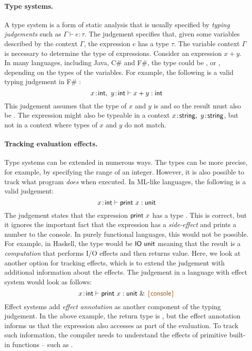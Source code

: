 \paragraph{Type systems.}
A type system is a form of static analysis that is usually specified by \emph{typing judgements}
such as $\Gamma \vdash e : \tau$. The judgement specifies that, given some variables described by
the context $\Gamma$, the expression $e$ has a type $\tau$.
The variable context $\Gamma$ is necessary to determine the type of expressions. Consider an
expression $x + y$. In many languages, including Java, C\# and F\#, the type could be ,
 or , depending on the types of the variables. For example,
the following is a valid typing judgement in F\# \cite{app-fsharp}:
%
\begin{equation*}
x\!:\!\ident{int},~y\!:\!\ident{int} \vdash x+y : \ident{int}
\end{equation*}
%
This judgement assumes that the type of $x$ and $y$ is  and so the result must also
be . The expression might also be typeable in a context $x\!:\!\textnormal{\sffamily string},~y\!:\!\textnormal{\sffamily string}$,
but not in a context where types of $x$ and $y$ do not match.

\paragraph{Tracking evaluation effects.}
Type systems can be extended in numerous ways. The types can be more precise, for example, by specifying
the range of an integer. However, it is also possible to track what program \emph{does} when executed.
In ML-like languages, the following is a valid judgement:
%
\begin{equation*}
x\!:\!\textnormal{\sffamily int} \vdash \textnormal{\sffamily print}~x : \textnormal{\sffamily unit}
\end{equation*}
%
The judgement states that the expression $\textnormal{\sffamily print}~x$ has a type . This is correct,
but it ignores the important fact that the expression has a \emph{side-effect} and prints a number
to the console. In purely functional languages, this would not be possible. For example, in Haskell,
the type would be $\textnormal{\sffamily IO unit}$ meaning that the result is a \emph{computation} that performs I/O
effects and then returns  value. Here, we look at another option for tracking effects,
which is to extend the judgement with additional information about the effects. The judgement in a
language with effect system would look as follows:
%
\begin{equation*}
x\!:\!\ident{int} \vdash \ident{print}~x : \ident{unit}~\&~\aclrd{\{ \ident{console} \}}
\end{equation*}
%
Effect systems add \emph{effect annotation} as another component of the typing judgement. In the above
example, the return type is , but the effect annotation informs us that the expression
also accesses  as part of the evaluation. To track such information, the compiler needs
to understand the effects of primitive built-in functions -- such as .

